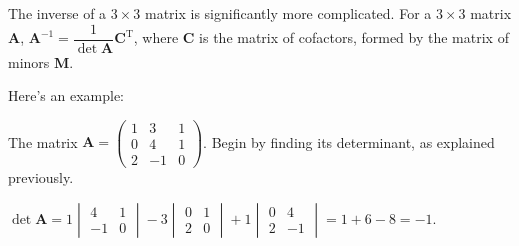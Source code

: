 \documentclass[../main.tex]{subfile}
\begin{document}
The inverse of a $3 \times 3$ matrix is significantly more complicated. For a $3 \times 3$ matrix $\mathbf{A}$, $\boxed{\mathbf{A}^{-1} = \dfrac{1}{\det\mathbf{A}} \mathbf{C}^\text{T}}$, where $\mathbf{C}$ is the matrix of cofactors, formed by the matrix of minors $\mathbf{M}$.

Here's an example:


The matrix $\displaystyle \mathbf{A} = \begin{pmatrix}1 & 3 & 1\\ 0 & 4 & 1\\ 2 & -1 & 0\end{pmatrix}$. Begin by finding its determinant, as explained previously.

$\det\mathbf{A} = 1 \begin{vmatrix}4 & 1\\ -1 & 0\end{vmatrix} - 3 \begin{vmatrix}0 & 1\\ 2 & 0\end{vmatrix} + 1 \begin{vmatrix}0 & 4\\ 2 & -1\end{vmatrix} = 1 + 6 - 8 = -1$.

\end{document}
